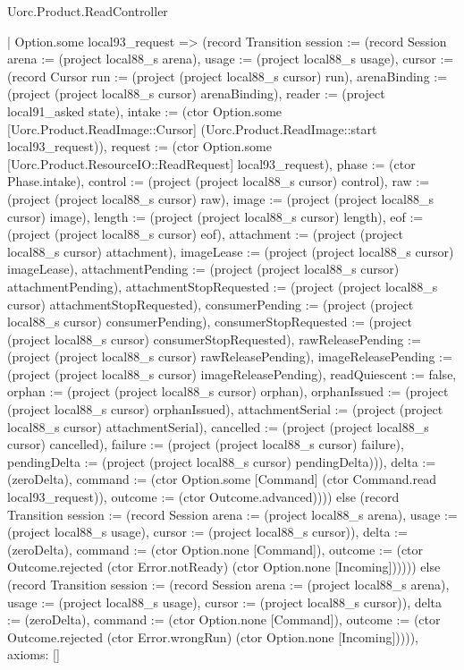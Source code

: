 \begin{lexlean}{Uorc.Product.ReadController}
\begin{semanticmodule}
{    | Option.some local93_request => (record Transition {session := (record Session {arena := (project local88_s arena), usage := (project local88_s usage), cursor := (record Cursor {run := (project (project local88_s cursor) run), arenaBinding := (project (project local88_s cursor) arenaBinding), reader := (project local91_asked state), intake := (ctor Option.some [Uorc.Product.ReadImage::Cursor] (Uorc.Product.ReadImage::start local93_request)), request := (ctor Option.some [Uorc.Product.ResourceIO::ReadRequest] local93_request), phase := (ctor Phase.intake), control := (project (project local88_s cursor) control), raw := (project (project local88_s cursor) raw), image := (project (project local88_s cursor) image), length := (project (project local88_s cursor) length), eof := (project (project local88_s cursor) eof), attachment := (project (project local88_s cursor) attachment), imageLease := (project (project local88_s cursor) imageLease), attachmentPending := (project (project local88_s cursor) attachmentPending), attachmentStopRequested := (project (project local88_s cursor) attachmentStopRequested), consumerPending := (project (project local88_s cursor) consumerPending), consumerStopRequested := (project (project local88_s cursor) consumerStopRequested), rawReleasePending := (project (project local88_s cursor) rawReleasePending), imageReleasePending := (project (project local88_s cursor) imageReleasePending), readQuiescent := false, orphan := (project (project local88_s cursor) orphan), orphanIssued := (project (project local88_s cursor) orphanIssued), attachmentSerial := (project (project local88_s cursor) attachmentSerial), cancelled := (project (project local88_s cursor) cancelled), failure := (project (project local88_s cursor) failure), pendingDelta := (project (project local88_s cursor) pendingDelta)})}), delta := (zeroDelta), command := (ctor Option.some [Command] (ctor Command.read local93_request)), outcome := (ctor Outcome.advanced)}))) else (record Transition {session := (record Session {arena := (project local88_s arena), usage := (project local88_s usage), cursor := (project local88_s cursor)}), delta := (zeroDelta), command := (ctor Option.none [Command]), outcome := (ctor Outcome.rejected (ctor Error.notReady) (ctor Option.none [Incoming]))}))) else (record Transition {session := (record Session {arena := (project local88_s arena), usage := (project local88_s usage), cursor := (project local88_s cursor)}), delta := (zeroDelta), command := (ctor Option.none [Command]), outcome := (ctor Outcome.rejected (ctor Error.wrongRun) (ctor Option.none [Incoming]))})),
  axioms: []
}


\end{semanticmodule}
\end{lexlean}
